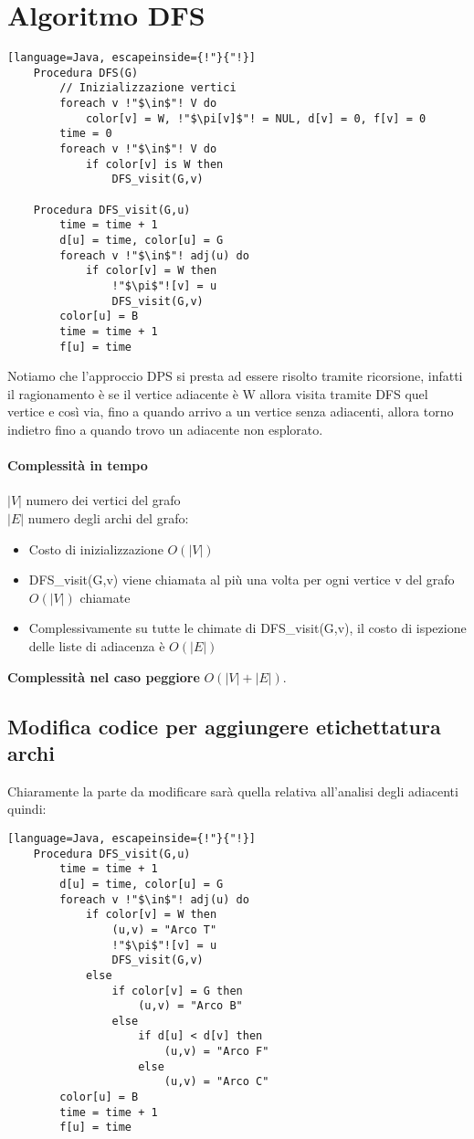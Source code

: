 \section{Algoritmo DFS}
\begin{lstlisting}[language=Java, escapeinside={!"}{"!}]
    Procedura DFS(G)
        // Inizializzazione vertici
        foreach v !"$\in$"! V do
            color[v] = W, !"$\pi[v]$"! = NUL, d[v] = 0, f[v] = 0
        time = 0
        foreach v !"$\in$"! V do
            if color[v] is W then
                DFS_visit(G,v)

    Procedura DFS_visit(G,u)
        time = time + 1
        d[u] = time, color[u] = G
        foreach v !"$\in$"! adj(u) do
            if color[v] = W then
                !"$\pi$"![v] = u
                DFS_visit(G,v)
        color[u] = B
        time = time + 1
        f[u] = time
\end{lstlisting}
Notiamo che l'approccio DPS si presta ad essere risolto tramite ricorsione, infatti 
il ragionamento è se il vertice adiacente è W allora visita tramite DFS quel vertice e così via,
fino a quando arrivo a un vertice senza adiacenti, allora torno indietro fino a quando
trovo un adiacente non esplorato.
\paragraph*{Complessità in tempo} $|V|$ \ra numero dei vertici del grafo\\
$|E|$ \ra numero degli archi del grafo:
\begin{itemize}
    \item Costo di inizializzazione \ra $O(|V|)$
    \item DFS\_visit(G,v) viene chiamata al più una volta per ogni vertice v del grafo \ra
    $O(|V|)$ chiamate
    \item Complessivamente su tutte le chimate di DFS\_visit(G,v), il costo di ispezione 
    delle liste di adiacenza è $O(|E|)$
\end{itemize}
\textbf{Complessità nel caso peggiore} $O(|V|+|E|)$.
\subsection{Modifica codice per aggiungere etichettatura archi}
Chiaramente la parte da modificare sarà quella relativa all'analisi degli adiacenti
quindi:
\begin{lstlisting}[language=Java, escapeinside={!"}{"!}]
    Procedura DFS_visit(G,u)
        time = time + 1
        d[u] = time, color[u] = G
        foreach v !"$\in$"! adj(u) do
            if color[v] = W then
                (u,v) = "Arco T"
                !"$\pi$"![v] = u
                DFS_visit(G,v)
            else 
                if color[v] = G then
                    (u,v) = "Arco B"
                else
                    if d[u] < d[v] then
                        (u,v) = "Arco F"
                    else
                        (u,v) = "Arco C" 
        color[u] = B
        time = time + 1
        f[u] = time
\end{lstlisting}
